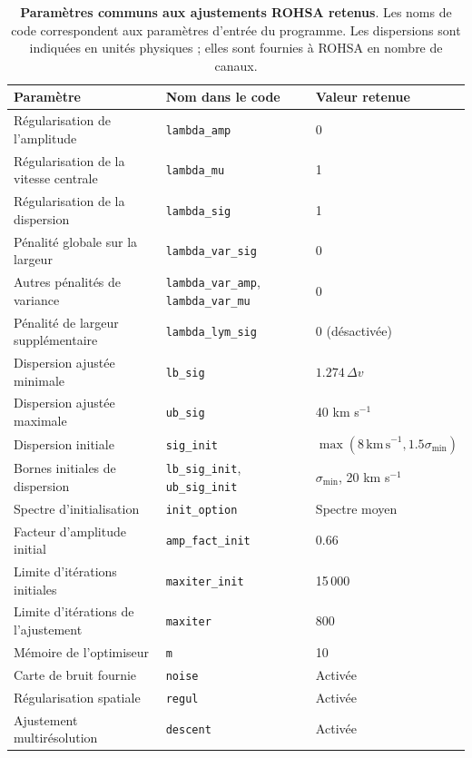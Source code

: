 
\begin{table}[H]
\centering
\caption{\textbf{Paramètres communs aux ajustements ROHSA retenus}. Les noms de code correspondent aux paramètres d'entrée du programme. Les dispersions sont indiquées en unités physiques ; elles sont fournies à ROHSA en nombre de canaux.}
\label{tab:rohsa_common_parameters}
\begingroup

\small
\renewcommand{\arraystretch}{1.2}
\begin{tabular}{lll}
\toprule
Paramètre & Nom dans le code & Valeur retenue \\
\midrule
Régularisation de l'amplitude & \texttt{lambda\_amp} & 0 \\
Régularisation de la vitesse centrale & \texttt{lambda\_mu} & 1 \\
Régularisation de la dispersion & \texttt{lambda\_sig} & 1 \\
Pénalité globale sur la largeur & \texttt{lambda\_var\_sig} & 0 \\
Autres pénalités de variance & \texttt{lambda\_var\_amp}, \texttt{lambda\_var\_mu} & 0 \\
Pénalité de largeur supplémentaire & \texttt{lambda\_lym\_sig} & 0 (désactivée) \\
Dispersion ajustée minimale & \texttt{lb\_sig} & $1.274\,\Delta v$ \\
Dispersion ajustée maximale & \texttt{ub\_sig} & 40 km s$^{-1}$ \\
Dispersion initiale & \texttt{sig\_init} & $\max(8\,\mathrm{km\,s}^{-1},1.5\sigma_{\min})$ \\
Bornes initiales de dispersion & \texttt{lb\_sig\_init}, \texttt{ub\_sig\_init} & $\sigma_{\min}$, 20 km s$^{-1}$ \\
Spectre d'initialisation & \texttt{init\_option} & Spectre moyen \\
Facteur d'amplitude initial & \texttt{amp\_fact\_init} & 0.66 \\
Limite d'itérations initiales & \texttt{maxiter\_init} & 15\,000 \\
Limite d'itérations de l'ajustement & \texttt{maxiter} & 800 \\
Mémoire de l'optimiseur & \texttt{m} & 10 \\
Carte de bruit fournie & \texttt{noise} & Activée \\
Régularisation spatiale & \texttt{regul} & Activée \\
Ajustement multirésolution & \texttt{descent} & Activée \\
\bottomrule
\end{tabular}
\endgroup
\end{table}
